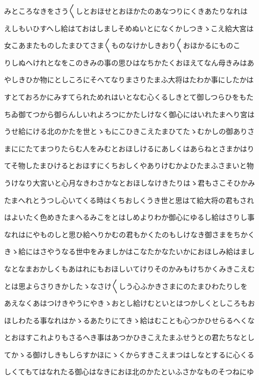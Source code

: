 \documentclass[a4paper,11pt,landscape]{ltjtarticle}
\begin{document}
みところなきをさう〱しとおほせとおほかたのあなつりにくきあたりなれは
\par\medskip
えしもいひすへし給はておはしましそめぬいとになくかしつきゝこえ給大宮は
\par\medskip
女こあまたものしたまひてさま〱ものなけかしきおり〱おほかるにものこ
\par\medskip
りしぬへけれとなをこのきみの事の思ひはなちかたくおほえてなん母きみはあ
\par\medskip
やしきひか物にとしころにそへてなりまさりたまふ大将はたわか事にしたかは
\par\medskip
すとておろかにみすてられためれはいとなむ心くるしきとて御しつらひをもた
\par\medskip
ちゐ御てつから御らんしいれよろつにかたしけなく御心にはいれたまへり宮は
\par\medskip
うせ給にける北のかたを世とゝもにこひきこえたまひてたゝむかしの御ありさ
\par\medskip
まににたてまつりたらむ人をみむとおほしけるにあしくはあらねとさまかはり
\par\medskip
てそ物したまひけるとおほすにくちおしくやありけむかよひたまふさまいと物
\par\medskip
うけなり大宮いと心月なきわさかなとおほしなけきたりはゝ君もさこそひかみ
\par\medskip
たまへれとうつし心いてくる時はくちおしくうき世と思はて給大将の君もされ
\par\medskip
はよいたく色めきたまへるみこをとはしめよりわか御心にゆるし給はさりし事
\par\medskip
なれはにやものしと思ひ給へりかむの君もかくたのもしけなき御さまをちかく
\par\medskip
きゝ給にはさやうなる世中をみましかはこなたかなたいかにおほしみ給はまし
\par\medskip
なとなまおかしくもあはれにもおほしいてけりそのかみもけちかくみきこえむ
\par\medskip
とは思よらさりきかしたゝなさけ〱しう心ふかきさまにのたまひわたりしを
\par\medskip
あえなくあはつけきやうにやきゝおとし給けむといとはつかしくとしころもお
\par\medskip
ほしわたる事なれはかゝるあたりにてきゝ給はむことも心つかひせらるへくな
\par\medskip
とおほすこれよりもさるへき事はあつかひきこえたまふせうとの君たちなとし
\par\medskip
てかゝる御けしきもしらすかほにゝくからすきこえまつはしなとするに心くる
\par\medskip
しくてもてはなれたる御心はなきにおほ北のかたといふさかなものそつねにゆ
\end{document}
